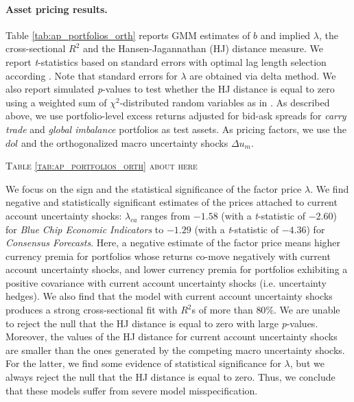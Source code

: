 \paragraph{Asset pricing results.}
Table \ref{tab:ap_portfolios_orth} reports GMM estimates of $b$ and implied $\lambda$, the cross-sectional $R^2$ and the Hansen-Jagannathan (HJ) distance measure. We report \emph{t}-statistics based on \citet{newey_west1987} standard errors with optimal lag length selection according \citet{andrews1991}. Note that standard errors for $\lambda$ are obtained via delta method. We also report simulated \emph{p}-values to test whether the HJ distance is equal to zero using a weighted sum of $\chi^2$-distributed random variables as in \citet{jagannathan/wang:96}. As described above, we use portfolio-level excess returns adjusted for bid-ask spreads for \emph{carry trade} and \emph{global imbalance} portfolios as test assets. As pricing factors, we use the $dol$ and the orthogonalized macro uncertainty shocks $\Delta u_{m}$.

\begin{center}
\textsc{Table \ref{tab:ap_portfolios_orth} about here}
\end{center}

We focus on the sign and the statistical significance of the factor price $\lambda$. We find negative and statistically significant estimates of the prices attached to current account uncertainty shocks: $\lambda_{ca}$ ranges from $-1.58$ (with a \emph{t}-statistic of $-2.60$) for \emph{Blue Chip Economic Indicators} to $-1.29$ (with a \emph{t}-statistic of $-4.36$) for \emph{Consensus Forecasts}. Here, a negative estimate of the factor price means higher currency premia for portfolios whose returns co-move negatively with current account uncertainty shocks, and lower currency premia for portfolios exhibiting a positive covariance with current account uncertainty shocks (i.e. uncertainty hedges). We also find that the model with current account uncertainty shocks produces a strong cross-sectional fit with $R^{2}$s of more than $80\%$. We are unable to reject the null that the HJ distance is equal to zero with large \emph{p}-values. Moreover, the values of the HJ distance for current account uncertainty shocks are smaller than the ones generated by the competing macro uncertainty shocks. For the latter, we find some evidence of statistical significance for $\lambda$, but we always reject the null that the HJ distance is equal to zero. Thus, we conclude that these models suffer from severe model misspecification.

